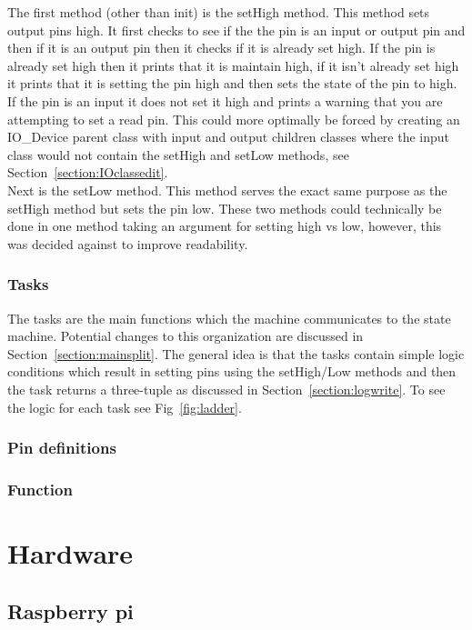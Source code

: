 \documentclass{article}
\begin{document}
The first method (other than init) is the setHigh method. This method sets output pins high. It first checks to see if the the pin is an input or output pin and then if it is an output pin then it checks if it is already set high. If the pin is already set high then it prints that it is maintain high, if it isn't already set high it prints that it is setting the pin high and then sets the state of the pin to high. If the pin is an input it does not set it high and prints a warning that you are attempting to set a read pin. This could more optimally be forced by creating an IO\_Device parent class with input and output children classes where the input class would not contain the setHigh and setLow methods, see Section~\ref{section:IOclassedit}.\\

Next is the setLow method. This method serves the exact same purpose as the setHigh method but sets the pin low. These two methods could technically be done in one method taking an argument for setting high vs low, however, this was decided against to improve readability.\\

\subsubsection{Tasks}
The tasks are the main functions which the machine communicates to the state machine. Potential changes to this organization are discussed in Section~\ref{section:mainsplit}. The general idea is that the tasks contain simple logic conditions which result in setting pins using the setHigh/Low methods and then the task returns a three-tuple as discussed in Section~\ref{section:logwrite}. To see the logic for each task see Fig~\ref{fig:ladder}.

\subsubsection{Pin definitions}

\subsubsection{Function}

\section{Hardware}
\subsection{Raspberry pi}
\label{section:raspi}
\end{document}
